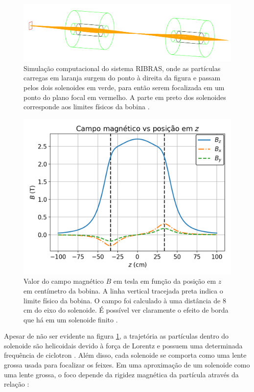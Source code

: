 \documentclass[a4paper,12pt,oneside]{book}
\begin{document}
\begin{figure}[H]
    \centering
    \includegraphics[scale = 0.95]{figs/Foco2S.png}
    \caption{Simulação computacional do sistema RIBRAS, onde as partículas carregas em laranja surgem do ponto à direita da figura e passam pelos dois solenoides em verde, para então serem focalizada em um ponto do plano focal em vermelho. A parte em preto dos solenoides corresponde aos limites físicos da bobina \cite{ribras_leo}.}
    \label{fig:sim_ribras}
\end{figure}

\begin{figure}[H]
    \centering
    \includegraphics[scale = 0.85]{figs/Campo_mag.png}
    \caption{Valor do campo magnético $B$ em tesla em função da posição em $z$ em centímetro da bobina. A linha vertical tracejada preta indica o limite físico da bobina. O campo foi calculado à uma distância de 8 cm do eixo do solenoide. É possível ver claramente o efeito de borda que há em um solenoide finito \cite{magnetic_field}.}
    \label{fig:campo_mag}
\end{figure}


\par Apesar de não ser evidente na figura \ref{fig:sim_ribras}, a trajetória as partículas dentro do solenoide são helicoidais devido à força de Lorentz e possuem uma determinada frequência de ciclotron \cite{ribras_leo}. Além disso, cada solenoide se comporta como uma lente grossa usada para focalizar os feixes. Em uma aproximação de um solenoide como uma lente grossa, o foco depende da rigidez magnética da partícula através da relação \cite{KOLATA1989503, zamora_mater}:
\end{document}

